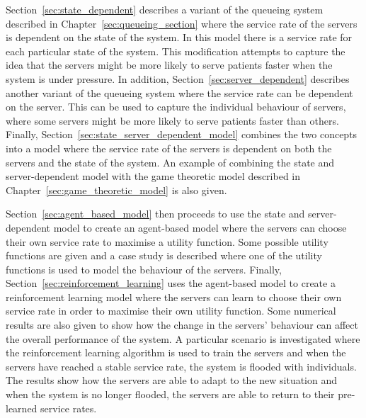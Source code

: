 Section~\ref{sec:state_dependent} describes a variant of the queueing system
described in Chapter~\ref{sec:queueing_section} where the service rate of the
servers is dependent on the state of the system.
In this model there is a service rate for each particular state of the system.
This modification attempts to capture the idea that the servers might be more
likely to serve patients faster when the system is under pressure.
In addition, Section~\ref{sec:server_dependent} describes another variant of
the queueing system where the service rate can be dependent on the server.
This can be used to capture the individual behaviour of servers, where some
servers might be more likely to serve patients faster than others.
Finally, Section~\ref{sec:state_server_dependent_model} combines the two
concepts into a model where the service rate of the servers is dependent on
both the servers and the state of the system.
An example of combining the state and server-dependent model with the game
theoretic model described in Chapter~\ref{sec:game_theoretic_model} is also
given.

Section~\ref{sec:agent_based_model} then proceeds to use the state and
server-dependent model to create an agent-based model where the servers can
choose their own service rate to maximise a utility function.
Some possible utility functions are given and a case study is described where
one of the utility functions is used to model the behaviour of the servers.
Finally, Section~\ref{sec:reinforcement_learning} uses the agent-based model
to create a reinforcement learning model where the servers can learn to choose
their own service rate in order to maximise their own utility function.
Some numerical results are also given to show how the change in the servers'
behaviour can affect the overall performance of the system.
A particular scenario is investigated where the reinforcement learning
algorithm is used to train the servers and when the servers have reached a
stable service rate, the system is flooded with individuals.
The results show how the servers are able to adapt to the new situation and
when the system is no longer flooded, the servers are able to return to their
pre-learned service rates.
